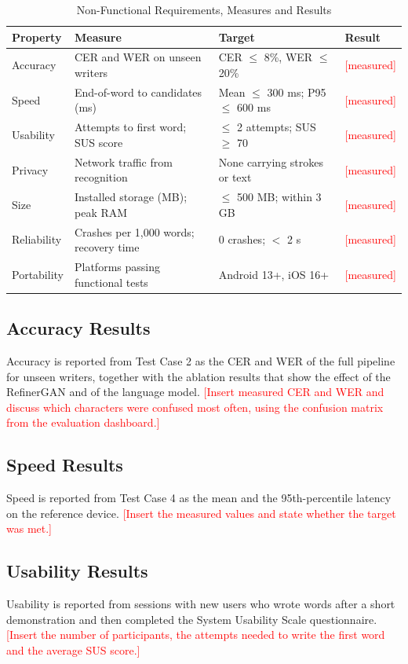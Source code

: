 \documentclass[12pt,a4paper]{report}
\newcommand{\todo}[1]{\textcolor{red}{[#1]}}
\begin{document}
\begin{table}[H]
\caption{Non-Functional Requirements, Measures and Results}\label{tab:nfr}
\centering\small\renewcommand{\arraystretch}{1.15}
\begin{tabular}{|p{1.0in}|p{1.6in}|p{1.5in}|p{1.2in}|}
\hline
\textbf{Property} & \textbf{Measure} & \textbf{Target} & \textbf{Result}\\\hline
Accuracy & CER and WER on unseen writers & CER $\leq$ 8\%, WER $\leq$ 20\% & \todo{measured}\\\hline
Speed & End-of-word to candidates (ms) & Mean $\leq$ 300 ms; P95 $\leq$ 600 ms & \todo{measured}\\\hline
Usability & Attempts to first word; SUS score & $\leq$ 2 attempts; SUS $\geq$ 70 & \todo{measured}\\\hline
Privacy & Network traffic from recognition & None carrying strokes or text & \todo{measured}\\\hline
Size & Installed storage (MB); peak RAM & $\leq$ 500 MB; within 3 GB & \todo{measured}\\\hline
Reliability & Crashes per 1,000 words; recovery time & 0 crashes; $<$ 2 s & \todo{measured}\\\hline
Portability & Platforms passing functional tests & Android 13+, iOS 16+ & \todo{measured}\\\hline
\end{tabular}
\end{table}

\subsection{Accuracy Results}
Accuracy is reported from Test Case 2 as the CER and WER of the full pipeline for unseen writers, together with the ablation results that show the effect of the RefinerGAN and of the language model. \todo{Insert measured CER and WER and discuss which characters were confused most often, using the confusion matrix from the evaluation dashboard.}

\subsection{Speed Results}
Speed is reported from Test Case 4 as the mean and the 95th-percentile latency on the reference device. \todo{Insert the measured values and state whether the target was met.}

\subsection{Usability Results}
Usability is reported from sessions with new users who wrote words after a short demonstration and then completed the System Usability Scale questionnaire. \todo{Insert the number of participants, the attempts needed to write the first word and the average SUS score.}
\end{document}
